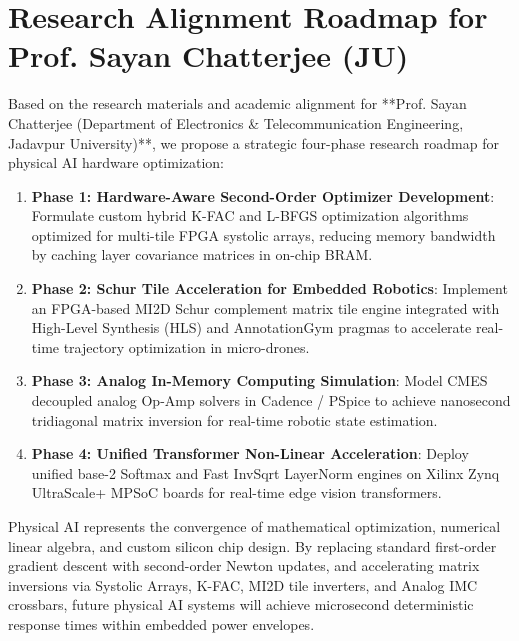 \section{Research Alignment Roadmap for Prof. Sayan Chatterjee (JU)}
Based on the research materials and academic alignment for **Prof. Sayan Chatterjee (Department of Electronics \& Telecommunication Engineering, Jadavpur University)**, we propose a strategic four-phase research roadmap for physical AI hardware optimization:

\begin{enumerate}[leftmargin=*]
    \item \textbf{Phase 1: Hardware-Aware Second-Order Optimizer Development}:
    Formulate custom hybrid K-FAC and L-BFGS optimization algorithms optimized for multi-tile FPGA systolic arrays, reducing memory bandwidth by caching layer covariance matrices in on-chip BRAM.
    
    \item \textbf{Phase 2: Schur Tile Acceleration for Embedded Robotics}:
    Implement an FPGA-based MI2D Schur complement matrix tile engine integrated with High-Level Synthesis (HLS) and AnnotationGym pragmas to accelerate real-time trajectory optimization in micro-drones.
    
    \item \textbf{Phase 3: Analog In-Memory Computing Simulation}:
    Model CMES decoupled analog Op-Amp solvers in Cadence / PSpice to achieve nanosecond tridiagonal matrix inversion for real-time robotic state estimation.
    
    \item \textbf{Phase 4: Unified Transformer Non-Linear Acceleration}:
    Deploy unified base-2 Softmax and Fast InvSqrt LayerNorm engines on Xilinx Zynq UltraScale+ MPSoC boards for real-time edge vision transformers.
\end{enumerate}

\begin{takeawaybox}
Physical AI represents the convergence of mathematical optimization, numerical linear algebra, and custom silicon chip design. By replacing standard first-order gradient descent with second-order Newton updates, and accelerating matrix inversions via Systolic Arrays, K-FAC, MI2D tile inverters, and Analog IMC crossbars, future physical AI systems will achieve microsecond deterministic response times within embedded power envelopes.
\end{takeawaybox}
